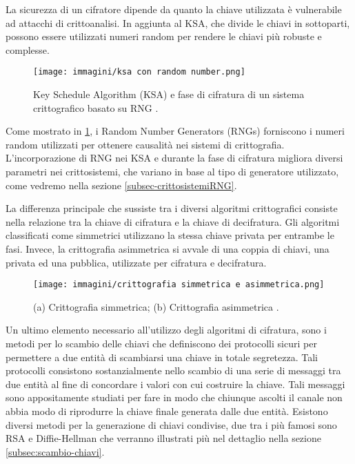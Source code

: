 La sicurezza di un cifratore dipende da quanto la chiave utilizzata è vulnerabile ad attacchi di crittoanalisi. In aggiunta al KSA, che divide le chiavi in sottoparti, possono essere utilizzati numeri random per rendere le chiavi più robuste e complesse.
\begin{figure}[h]
    \centering
    \texttt{[image: immagini/ksa con random number.png]}
    \caption{Key Schedule Algorithm (KSA) e fase di cifratura di un sistema crittografico basato su RNG \cite{saini_quantum_2022}. }
    \label{fig: KSA con RNG}
\end{figure}
Come mostrato in \ref{fig: KSA con RNG}, i Random Number Generators (RNGs) forniscono i numeri random utilizzati per ottenere causalità nei sistemi di crittografia. L'incorporazione di RNG nei KSA e durante la fase di cifratura migliora diversi parametri nei crittosistemi, che variano in base al tipo di generatore utilizzato, come vedremo nella sezione \ref{subsec-crittosistemiRNG}. 

La differenza principale che sussiste tra i diversi algoritmi crittografici consiste nella relazione tra la chiave di cifratura e la chiave di decifratura. Gli algoritmi classificati come simmetrici utilizzano la stessa chiave privata per entrambe le fasi. Invece, la crittografia asimmetrica si avvale di una coppia di chiavi, una privata ed una pubblica, utilizzate per cifratura e decifratura. 

\begin{figure}[h]
    \centering
    \texttt{[image: immagini/crittografia simmetrica e asimmetrica.png]}
    \caption{(a) Crittografia simmetrica; (b) Crittografia asimmetrica \cite{saini_quantum_2022}.}
\end{figure}

Un ultimo elemento necessario all'utilizzo degli algoritmi di cifratura, sono i metodi per lo scambio delle chiavi che definiscono dei protocolli sicuri per permettere a due entità di scambiarsi una chiave in totale segretezza. Tali protocolli consistono sostanzialmente nello scambio di una serie di messaggi tra due entità al fine di concordare i valori con cui costruire la chiave. Tali messaggi sono appositamente studiati per fare in modo che chiunque ascolti il canale non abbia modo di riprodurre la chiave finale generata dalle due entità. Esistono diversi metodi per la generazione di chiavi condivise, due tra i più famosi sono RSA e Diffie-Hellman che verranno illustrati più nel dettaglio nella sezione \ref{subsec:scambio-chiavi}.

